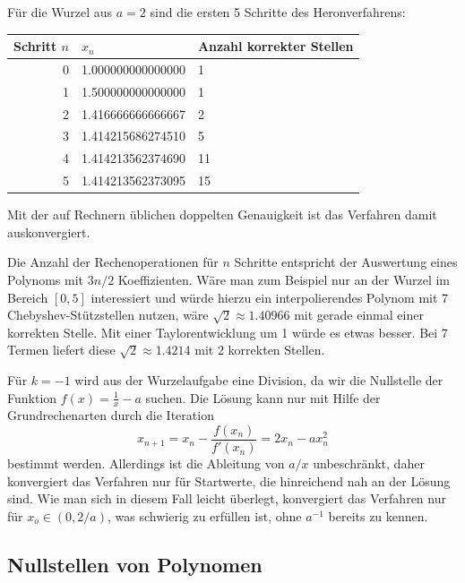 Für die Wurzel aus $a=2$ sind die ersten 5 Schritte des Heronverfahrens:
\begin{center}
  \begin{tabular}{r|l|l}
    Schritt $n$ & $x_n$ & Anzahl korrekter Stellen \\\hline
    0 & 1.000000000000000 & 1 \\
    1 & 1.500000000000000 & 1 \\
    2 & 1.416666666666667 & 2 \\
    3 & 1.414215686274510 & 5 \\
    4 & 1.414213562374690 & 11 \\ 
    5 & 1.414213562373095 & 15
  \end{tabular}
\end{center}
Mit der auf Rechnern üblichen doppelten Genauigkeit ist das Verfahren
damit auskonvergiert.

Die Anzahl der Rechenoperationen für $n$ Schritte entspricht der
Auswertung eines Polynoms mit $3n/2$ Koeffizienten. Wäre man zum
Beispiel nur an der Wurzel im Bereich $[0,5]$ interessiert und würde
hierzu ein interpolierendes Polynom mit 7 Chebyshev-Stützstellen
nutzen, wäre $\sqrt{2}\approx 1.40966$ mit gerade einmal einer
korrekten Stelle. Mit einer Taylorentwicklung um 1 würde es etwas
besser. Bei 7 Termen liefert diese $\sqrt{2}\approx 1.4214$ mit 2
korrekten Stellen.

Für $k=-1$ wird aus der Wurzelaufgabe eine Division, da wir die
Nullstelle der Funktion $f(x) = \frac{1}{x} - a$ suchen. Die Lösung
kann nur mit Hilfe der Grundrechenarten durch die Iteration
\begin{equation}
  x_{n+1} = x_n - \frac{f(x_n)}{f'(x_n)} = 2x_n - a x_n^2 
\end{equation}
bestimmt werden. Allerdings ist die Ableitung von $a/x$ unbeschränkt,
daher konvergiert das Verfahren nur für Startwerte, die hinreichend
nah an der Lösung sind. Wie man sich in diesem Fall leicht überlegt,
konvergiert das Verfahren nur für $x_o\in (0, 2/a)$, was schwierig zu
erfüllen ist, ohne $a^{-1}$ bereits zu kennen.

\subsection{Nullstellen von Polynomen}

